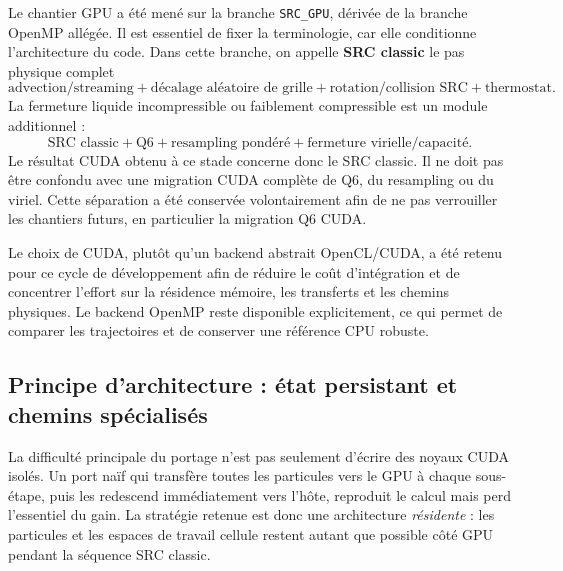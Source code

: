 \documentclass[11pt,a4paper]{article}
\begin{document}
Le chantier GPU a été mené sur la branche \texttt{SRC\_GPU}, dérivée de la branche OpenMP allégée. Il est essentiel de fixer la terminologie, car elle conditionne l'architecture du code. Dans cette branche, on appelle \textbf{SRC classic} le pas physique complet
\begin{equation}
  \text{advection/streaming}
  + \text{décalage aléatoire de grille}
  + \text{rotation/collision SRC}
  + \text{thermostat}.
\end{equation}
La fermeture liquide incompressible ou faiblement compressible est un module additionnel :
\begin{equation}
  \text{SRC classic}
  + \text{Q6}
  + \text{resampling pondéré}
  + \text{fermeture virielle/capacité}.
\end{equation}
Le résultat CUDA obtenu à ce stade concerne donc le SRC classic. Il ne doit pas être confondu avec une migration CUDA complète de Q6, du resampling ou du viriel. Cette séparation a été conservée volontairement afin de ne pas verrouiller les chantiers futurs, en particulier la migration Q6 CUDA.

Le choix de CUDA, plutôt qu'un backend abstrait OpenCL/CUDA, a été retenu pour ce cycle de développement afin de réduire le coût d'intégration et de concentrer l'effort sur la résidence mémoire, les transferts et les chemins physiques. Le backend OpenMP reste disponible explicitement, ce qui permet de comparer les trajectoires et de conserver une référence CPU robuste.

\subsection{Principe d'architecture : état persistant et chemins spécialisés}

La difficulté principale du portage n'est pas seulement d'écrire des noyaux CUDA isolés. Un port naïf qui transfère toutes les particules vers le GPU à chaque sous-étape, puis les redescend immédiatement vers l'hôte, reproduit le calcul mais perd l'essentiel du gain. La stratégie retenue est donc une architecture \emph{résidente} : les particules et les espaces de travail cellule restent autant que possible côté GPU pendant la séquence SRC classic.
\end{document}
